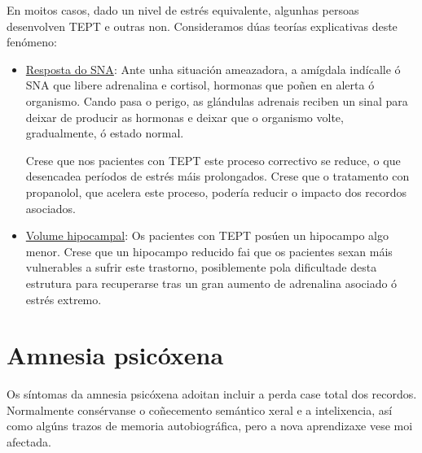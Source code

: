 \documentclass[a4paper,11pt]{article}
\begin{document}
En moitos casos, dado un nivel de estrés equivalente, algunhas persoas desenvolven TEPT e outras non. Consideramos dúas teorías explicativas deste fenómeno:
\begin{itemize}
	\item \underline{Resposta do SNA}: Ante unha situación ameazadora, a amígdala indícalle ó SNA 
	que libere adrenalina e cortisol, hormonas que poñen en alerta ó organismo. Cando pasa o perigo, 
	as glándulas adrenais reciben un sinal para deixar de producir as hormonas e deixar que o 
	organismo volte, gradualmente, ó estado normal.
	
	Crese que nos pacientes con TEPT este proceso correctivo se reduce, o que desencadea períodos de
	estrés máis prolongados. Crese que o tratamento con propanolol, que acelera este proceso, 
	podería reducir o impacto dos recordos asociados.
	\item \underline{Volume hipocampal}: Os pacientes con TEPT posúen un hipocampo algo menor. Crese
	que un hipocampo reducido fai que os pacientes sexan máis vulnerables a sufrir este trastorno,
	posiblemente pola dificultade desta estrutura para recuperarse tras un gran aumento de
	adrenalina asociado ó estrés extremo.
\end{itemize}

\section{Amnesia psicóxena}
Os síntomas da amnesia psicóxena adoitan incluir a perda case total dos recordos. Normalmente consérvanse o coñecemento semántico xeral e a intelixencia, así como algúns trazos de memoria autobiográfica, pero a nova aprendizaxe vese moi afectada.
\end{document}
